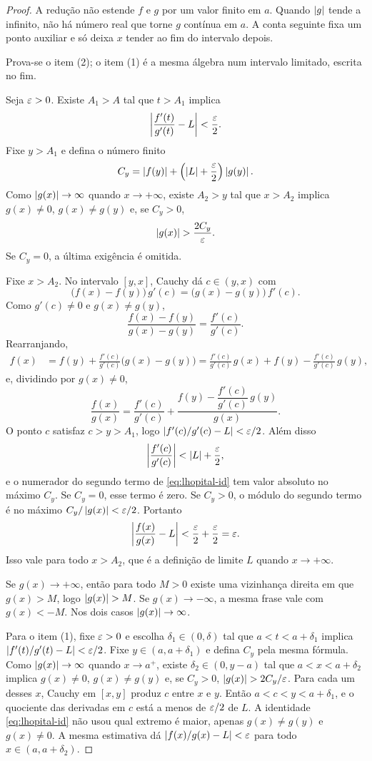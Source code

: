\documentclass[11pt,a4paper]{article}
\begin{document}
\begin{proof}
A redução não estende $f$ e $g$ por um valor finito em $a$. Quando $\left\lvert g \right\rvert$ tende a infinito, não há número real que torne $g$ contínua em $a$. A conta seguinte fixa um ponto auxiliar e só deixa $x$ tender ao fim do intervalo depois.

Prova-se o item (2); o item (1) é a mesma álgebra num intervalo limitado, escrita no fim.

Seja $\varepsilon>0$. Existe $A_1>A$ tal que $t>A_1$ implica
\[
\left\lvert \frac{f'(t)}{g'(t)}-L \right\rvert<\frac{\varepsilon}{2}.
\]
Fixe $y>A_1$ e defina o número finito
\[
C_y=\left\lvert f(y) \right\rvert+\Bigl(\left\lvert L \right\rvert+\frac{\varepsilon}{2}\Bigr)\left\lvert g(y) \right\rvert.
\]
Como $\left\lvert g(x) \right\rvert\to\infty$ quando $x\to+\infty$, existe $A_2>y$ tal que $x>A_2$ implica $g(x)\neq 0$, $g(x)\neq g(y)$ e, se $C_y>0$,
\[
\left\lvert g(x) \right\rvert>\frac{2C_y}{\varepsilon}.
\]
Se $C_y=0$, a última exigência é omitida.

Fixe $x>A_2$. No intervalo $[y,x]$, Cauchy dá $c\in(y,x)$ com
\[
\bigl(f(x)-f(y)\bigr)\,g'(c)=\bigl(g(x)-g(y)\bigr)\,f'(c).
\]
Como $g'(c)\neq 0$ e $g(x)\neq g(y)$,
\[
\frac{f(x)-f(y)}{g(x)-g(y)}=\frac{f'(c)}{g'(c)}.
\]
Rearranjando,
\begin{align*}
f(x)
&=f(y)+\frac{f'(c)}{g'(c)}\bigl(g(x)-g(y)\bigr)
=\frac{f'(c)}{g'(c)}\,g(x)+f(y)-\frac{f'(c)}{g'(c)}\,g(y),
\end{align*}
e, dividindo por $g(x)\neq 0$,
\begin{equation}
\label{eq:lhopital-id}
\frac{f(x)}{g(x)}
=\frac{f'(c)}{g'(c)}+\frac{f(y)-\dfrac{f'(c)}{g'(c)}\,g(y)}{g(x)}.
\end{equation}
O ponto $c$ satisfaz $c>y>A_1$, logo $\left\lvert f'(c)/g'(c)-L \right\rvert<\varepsilon/2$. Além disso
\[
\left\lvert \frac{f'(c)}{g'(c)} \right\rvert<\left\lvert L \right\rvert+\frac{\varepsilon}{2},
\]
e o numerador do segundo termo de \eqref{eq:lhopital-id} tem valor absoluto no máximo $C_y$. Se $C_y=0$, esse termo é zero. Se $C_y>0$, o módulo do segundo termo é no máximo $C_y/\left\lvert g(x) \right\rvert<\varepsilon/2$. Portanto
\[
\left\lvert \frac{f(x)}{g(x)}-L \right\rvert<\frac{\varepsilon}{2}+\frac{\varepsilon}{2}=\varepsilon.
\]
Isso vale para todo $x>A_2$, que é a definição de limite $L$ quando $x\to+\infty$.

Se $g(x)\to+\infty$, então para todo $M>0$ existe uma vizinhança direita em que $g(x)>M$, logo $\left\lvert g(x) \right\rvert>M$. Se $g(x)\to-\infty$, a mesma frase vale com $g(x)<-M$. Nos dois casos $\left\lvert g(x) \right\rvert\to\infty$.

Para o item (1), fixe $\varepsilon>0$ e escolha $\delta_1\in(0,\delta)$ tal que $a<t<a+\delta_1$ implica $\left\lvert f'(t)/g'(t)-L \right\rvert<\varepsilon/2$. Fixe $y\in(a,a+\delta_1)$ e defina $C_y$ pela mesma fórmula. Como $\left\lvert g(x) \right\rvert\to\infty$ quando $x\to a^+$, existe $\delta_2\in(0,y-a)$ tal que $a<x<a+\delta_2$ implica $g(x)\neq 0$, $g(x)\neq g(y)$ e, se $C_y>0$, $\left\lvert g(x) \right\rvert>2C_y/\varepsilon$. Para cada um desses $x$, Cauchy em $[x,y]$ produz $c$ entre $x$ e $y$. Então $a<c<y<a+\delta_1$, e o quociente das derivadas em $c$ está a menos de $\varepsilon/2$ de $L$. A identidade \eqref{eq:lhopital-id} não usou qual extremo é maior, apenas $g(x)\neq g(y)$ e $g(x)\neq 0$. A mesma estimativa dá $\left\lvert f(x)/g(x)-L \right\rvert<\varepsilon$ para todo $x\in(a,a+\delta_2)$.


\end{proof}
\end{document}
